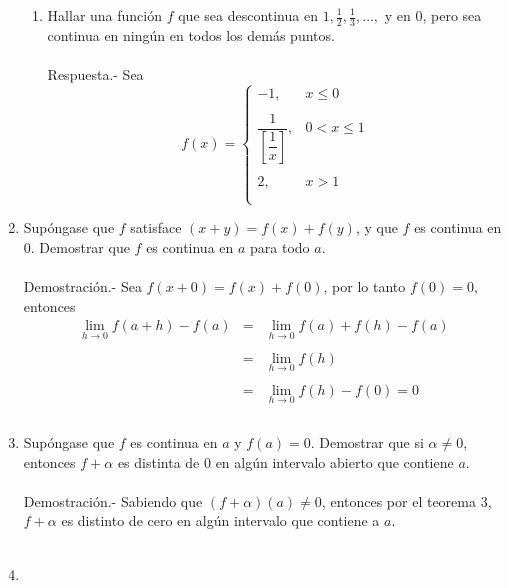 \begin{enumerate}[\bfseries 1.]
\begin{enumerate}[\bfseries (a)]
    \item Hallar una función $f$ que sea descontinua en $1,\frac{1}{2},\frac{1}{3},\ldots,$ y en $0$, pero sea continua en ningún en todos los demás puntos.\\\\
	Respuesta.-\; Sea 
	$$f(x) = \left\{\begin{array}{rl}
	-1,&x\leq 0\\\\
	\dfrac{1}{\left[\dfrac{1}{x}\right]},&0<x\leq 1\\\\
	  2,&x>1\\\\
	\end{array}\right.$$

\end{enumerate}

\item Supóngase que  $f$ satisface $(x+y) = f(x)+f(y)$, y que $f$ es continua en $0$. Demostrar que $f$ es continua en $a$ para todo $a$.\\\\
    Demostración.-\; Sea $f(x+0) = f(x)+f(0)$, por lo tanto $f(0)=0$, entonces
    $$\begin{array}{rcl}
	\lim\limits_{h\to 0} f(a+h) - f(a)&=&\lim\limits_{h\to 0}f(a)+f(h)-f(a)\\\\
	&=&\lim\limits_{h\to 0}f(h)\\\\
	&=&\lim\limits_{h\to 0} f(h)-f(0) = 0\\\\
    \end{array}$$

\item Supóngase que $f$ es continua en $a$ y $f(a)=0$. Demostrar que si $\alpha \neq 0$, entonces $f+\alpha$ es distinta de $0$ en algún intervalo abierto que contiene $a$.\\\\
    Demostración.-\; Sabiendo que $(f+\alpha)(a)\neq 0$, entonces por el teorema 3, $f+\alpha$ es distinto de cero en algún intervalo que contiene a $a$.\\\\

\item 
\begin{enumerate}[\bfseries (a)]


\end{enumerate}
\end{enumerate}
